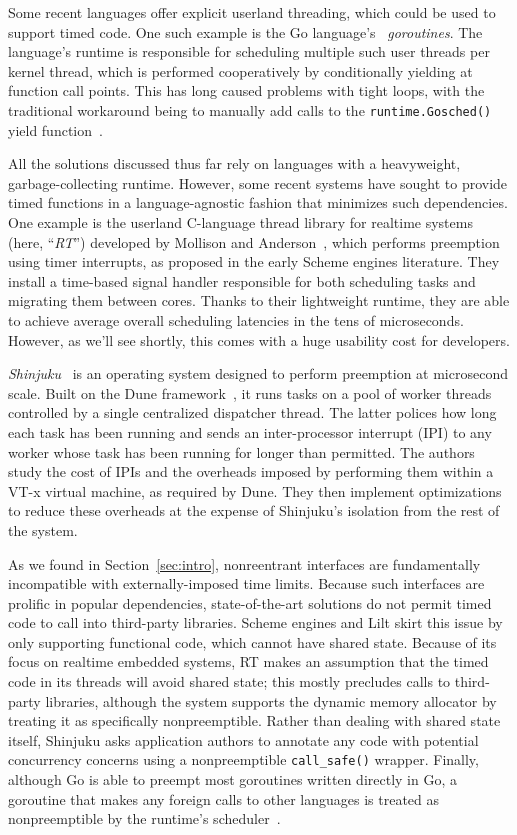 Some recent languages offer explicit userland threading, which could be used to
support timed
code.  One such example is the Go language's~\cite{www-golang} \textit{goroutines}.
The language's runtime is responsible for scheduling multiple such user
threads per kernel thread, which is performed cooperatively by conditionally yielding
at function call points.  This has long caused problems with tight loops, with the
traditional workaround being to manually add calls to the \texttt{runtime.Gosched()}
yield function~\cite{www-golang-tightloop}.

All the solutions discussed thus far rely on languages with a heavyweight,
garbage-collecting runtime.  However, some recent systems have sought
to provide timed functions in a language-agnostic fashion that minimizes such
dependencies.  One example is the userland C-language thread library for realtime
systems (here, ``\textit{RT}'') developed by Mollison and
Anderson~\cite{mollison:rtas2013}, which performs
preemption using timer interrupts, as proposed in the early Scheme engines
literature.  They install a time-based signal handler responsible for both scheduling
tasks and migrating them between cores.  Thanks to their lightweight runtime, they
are able to achieve average overall scheduling latencies in the tens of microseconds.
However, as we'll see shortly, this comes with a huge usability cost for developers.

\textit{Shinjuku}~\cite{Kaffes:nsdi2019} is an operating system designed to perform
preemption at microsecond scale.  Built on the Dune framework~\cite{Belay:osdi2012},
it runs tasks on a pool of worker threads controlled by a single centralized
dispatcher thread.  The latter polices how long each task has been running and
sends an inter-processor interrupt (IPI) to any worker whose task has been running
for longer than permitted.  The authors study the cost of IPIs and the overheads
imposed by performing them within a VT-x virtual machine, as required by Dune.  They
then implement optimizations to reduce these overheads at the expense of Shinjuku's
isolation from the rest of the system.

As we found in Section~\ref{sec:intro}, nonreentrant interfaces are fundamentally
incompatible with externally-imposed time limits.  Because such interfaces are
prolific in popular dependencies, state-of-the-art solutions do not permit timed code
to call into third-party libraries.  Scheme engines and
Lilt skirt this issue by only supporting functional code, which cannot have shared
state.  Because of its focus on realtime embedded systems, RT makes an assumption
that the timed code in its threads will avoid shared state; this mostly precludes
calls to third-party libraries, although the system supports the dynamic memory
allocator by treating it as specifically nonpreemptible.  Rather than dealing with
shared state itself, Shinjuku asks application authors to annotate any code with
potential concurrency concerns using a nonpreemptible \texttt{call\_safe()} wrapper.
Finally, although Go is able to preempt most goroutines written directly in Go, a
goroutine that makes any foreign calls to other languages is treated as
nonpreemptible by the runtime's scheduler~\cite{www-golang-fficall}.

